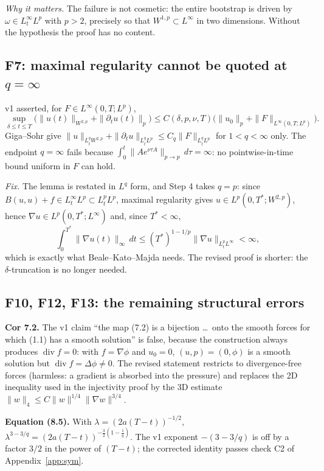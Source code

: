 \documentclass[11pt,a4paper]{article}
\begin{document}
\emph{Why it matters.} The failure is not cosmetic: the entire bootstrap is driven by
$\omega\in L^\infty_tL^p$ with $p>2$, precisely so that $W^{1,p}\subset L^\infty$ in two
dimensions. Without the hypothesis the proof has no content.

\subsection{F7: maximal regularity cannot be quoted at $q=\infty$}

v1 asserted, for $F\in L^\infty(0,T;L^p)$,
\[
\sup_{\delta\le t\le T}\bigl(\|u(t)\|_{W^{2,p}}+\|\partial_tu(t)\|_p\bigr)
\le C(\delta,p,\nu,T)\bigl(\|u_0\|_p+\|F\|_{L^\infty(0,T;L^p)}\bigr).
\]
Giga--Sohr give $\|u\|_{L^q_tW^{2,p}}+\|\partial_tu\|_{L^q_tL^p}\le C_q\|F\|_{L^q_tL^p}$ for
$1<q<\infty$ only. The endpoint $q=\infty$ fails because
$\int_0^t\|Ae^{\nu\tau A}\|_{p\to p}\,d\tau=\infty$: no pointwise-in-time bound uniform in $F$
can hold.

\emph{Fix.} The lemma is restated in $L^q$ form, and Step 4 takes $q=p$: since
$B(u,u)+f\in L^\infty_tL^p\subset L^p_tL^p$, maximal regularity gives
$u\in L^p(0,T^*;W^{2,p})$, hence $\nabla u\in L^p(0,T^*;L^\infty)$ and, since $T^*<\infty$,
\[
\int_0^{T^*}\|\nabla u(t)\|_\infty\,dt\le(T^*)^{1-1/p}\|\nabla u\|_{L^p_tL^\infty}<\infty ,
\]
which is exactly what Beale--Kato--Majda needs. The revised proof is shorter: the
$\delta$-truncation is no longer needed.

\subsection{F10, F12, F13: the remaining structural errors}

\textbf{Cor 7.2.} The v1 claim ``the map (7.2) is a bijection \dots\ onto the smooth forces for
which (1.1) has a smooth solution'' is false, because the construction always produces
$\operatorname{div}f=0$: with $f=\nabla\phi$ and $u_0=0$, $(u,p)=(0,\phi)$ is a smooth solution
but $\operatorname{div}f=\Delta\phi\ne0$. The revised statement restricts to divergence-free
forces (harmless: a gradient is absorbed into the pressure) and replaces the 2D inequality used
in the injectivity proof by the 3D estimate $\|w\|_4\le C\|w\|^{1/4}\|\nabla w\|^{3/4}$.

\textbf{Equation (8.5).} With $\lambda=(2a(T-t))^{-1/2}$,
$\lambda^{3-3/q}=(2a(T-t))^{-\frac32(1-\frac1q)}$. The v1 exponent $-(3-3/q)$ is off by a factor
$3/2$ in the power of $(T-t)$; the corrected identity passes check C2 of
Appendix~\ref{app:sym}.
\end{document}
